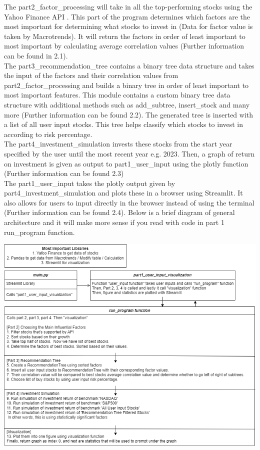 \documentclass[fontsize=11pt]{article}
\begin{document}
The part2\_factor\_processing will take in all the top-performing stocks using the Yahoo Finance API \cite{jecsandyahoo}. This part of the program determines which factors are the most important for determining what stocks to invest in (Data for factor value is taken by Macrotrends). It will return the factors in order of least important to most important by calculating average correlation values (Further information can be found in 2.1).\\

The part3\_recommendation\_tree contains a binary tree data structure and takes the input of the factors and their correlation values from part2\_factor\_processing and builds a binary tree in order of least important to most important features. This module contains a custom binary tree data structure with additional methods such as add\_subtree, insert\_stock and many more (Further information can be found 2.2). The generated tree is inserted with a list of all user input stocks. This tree helps classify which stocks to invest in according to risk percentage. \\

The part4\_investment\_simulation invests these stocks from the start year specified by the user until the most recent year e.g. 2023. Then, a graph of return on investment is given as output to part1\_user\_input using the plotly function (Further information can be found 2.3) \\

The part1\_user\_input takes the plotly output given by part4\_investment\_simulation and plots these in a browser using Streamlit. It also allows for users to input directly in the browser instead of using the terminal (Further information can be found 2.4). Below is a brief diagram of general architecture and it will make more sense if you read with code in part 1 run\_program function.

\begin{center}
\includegraphics[scale=0.5]{CSC111.drawio.png}
\end{center}
\end{document}
